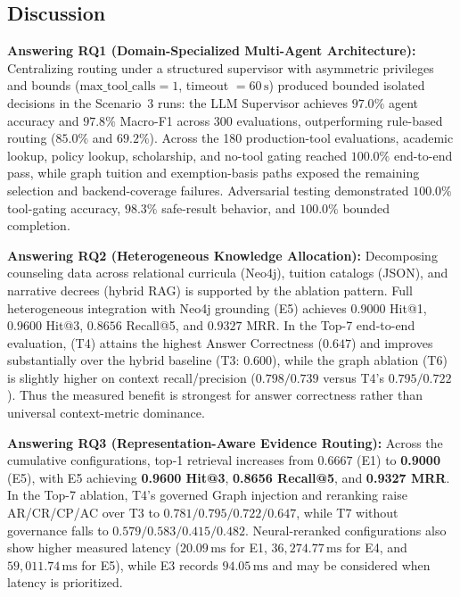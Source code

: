 \subsection{Discussion}
\label{sec:discussion}

\textbf{Answering RQ1 (Domain-Specialized Multi-Agent Architecture):} Centralizing routing under a structured supervisor with asymmetric privileges and bounds ($\text{max\_tool\_calls}=1$, timeout $=60\,\text{s}$) produced bounded isolated decisions in the Scenario~3 runs: the LLM Supervisor achieves $97.0\%$ agent accuracy and $97.8\%$ Macro-F1 across 300 evaluations, outperforming rule-based routing ($85.0\%$ and $69.2\%$). Across the 180 production-tool evaluations, academic lookup, policy lookup, scholarship, and no-tool gating reached $100.0\%$ end-to-end pass, while graph tuition and exemption-basis paths exposed the remaining selection and backend-coverage failures. Adversarial testing demonstrated $100.0\%$ tool-gating accuracy, $98.3\%$ safe-result behavior, and $100.0\%$ bounded completion.

\textbf{Answering RQ2 (Heterogeneous Knowledge Allocation):} Decomposing counseling data across relational curricula (Neo4j), tuition catalogs (JSON), and narrative decrees (hybrid RAG) is supported by the ablation pattern. Full heterogeneous integration with Neo4j grounding (E5) achieves $0.9000$ Hit@1, $0.9600$ Hit@3, $0.8656$ Recall@5, and $0.9327$ MRR. In the Top-7 end-to-end evaluation, \system{} (T4) attains the highest Answer Correctness ($0.647$) and improves substantially over the hybrid baseline (T3: $0.600$), while the graph ablation (T6) is slightly higher on context recall/precision ($0.798/0.739$ versus T4's $0.795/0.722$). Thus the measured benefit is strongest for answer correctness rather than universal context-metric dominance.

\textbf{Answering RQ3 (Representation-Aware Evidence Routing):} Across the cumulative configurations, top-1 retrieval increases from $0.6667$ (E1) to \textbf{0.9000} (E5), with E5 achieving \textbf{0.9600 Hit@3}, \textbf{0.8656 Recall@5}, and \textbf{0.9327 MRR}. In the Top-7 ablation, T4's governed Graph injection and reranking raise AR/CR/CP/AC over T3 to $0.781/0.795/0.722/0.647$, while T7 without governance falls to $0.579/0.583/0.415/0.482$. Neural-reranked configurations also show higher measured latency ($20.09\,\text{ms}$ for E1, $36{,}274.77\,\text{ms}$ for E4, and $59{,}011.74\,\text{ms}$ for E5), while E3 records $94.05\,\text{ms}$ and may be considered when latency is prioritized.

